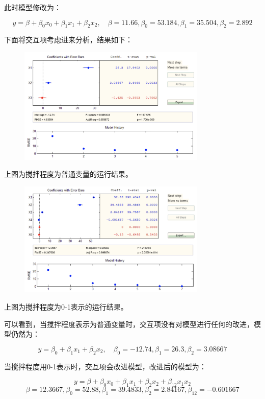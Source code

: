 \documentclass{article}
\begin{document}
此时模型修改为：

$$y=\beta +\beta_0x_0+\beta_1x_1+\beta_2x_2,\quad\beta=11.66,\beta_0=53.184,\beta_1=35.504,\beta_2=2.892$$


下面将交互项考虑进来分析，结果如下：

\begin{figure}[H]
    \centering
    \includegraphics[width=0.8\textwidth]{pic22.png}
\end{figure}

上图为搅拌程度为普通变量的运行结果。

\begin{figure}[H]
    \centering
    \includegraphics[width=0.8\textwidth]{pic23.png}
\end{figure}

上图为搅拌程度为0-1表示的运行结果。

可以看到，当搅拌程度表示为普通变量时，交互项没有对模型进行任何的改进，模型仍然为：

$$y=\beta_0+\beta_1x_1+\beta_2x_2,\quad \beta_0=-12.74,\beta_1=26.3,\beta_2=3.08667$$

当搅拌程度用0-1表示时，交互项会改进模型，改进后的模型为：

$$y=\beta +\beta_0x_0+\beta_1x_1+\beta_2x_2+\beta_{12}x_1x_2$$
$$\beta=12.3667,\beta_0=52.88,\beta_1=39.4833,\beta_2=2.84167,\beta_{12}=-0.601667$$
\end{document}
